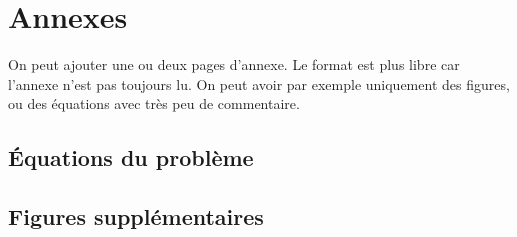 

\section{Annexes}

On peut ajouter une ou deux pages d'annexe. Le format est plus libre car
l'annexe n'est pas toujours lu. On peut avoir par exemple uniquement des figures, ou des équations avec très peu de commentaire.

\subsection{\'Equations du problème}

\vspace{2cm}

\subsection{Figures supplémentaires} 

\vspace{2cm}